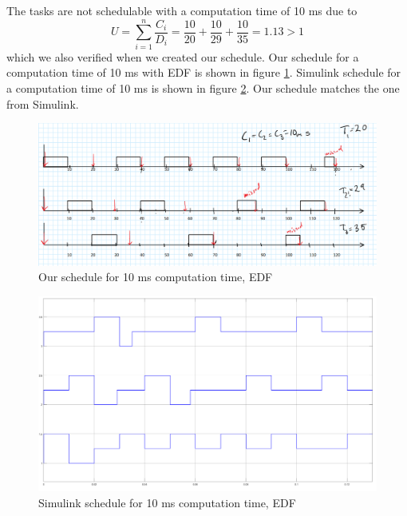 \documentclass[12pt,a4paper]{article}
\begin{document}
The tasks are not schedulable with a computation time of 10 ms due to 
\begin{equation}
U = \sum\limits_{i=1}^n \frac{C_i}{D_i} = \frac{10}{20}+\frac{10}{29}+\frac{10}{35} = 1.13 > 1
\end{equation}
which we also verified when we created our schedule. Our schedule for a
computation time of 10 ms with EDF is shown in figure \ref{fig:ex6541}. Simulink
schedule for a computation time of 10 ms is shown in figure
\ref{fig:ex6542}. Our
schedule matches the one from Simulink.

\begin{center}
	\begin{figure}[H]
      \centering
	\includegraphics[scale=0.4]{ex6541.png}
	\caption{Our schedule for 10 ms computation time, EDF}
	\label{fig:ex6541}
	\end{figure}
\end{center}
\begin{center}
	\begin{figure}[H]
      \centering
	\includegraphics[scale=0.2]{ex6542.png}
	\caption{Simulink schedule for 10 ms computation time, EDF}
	\label{fig:ex6542}
	\end{figure}
\end{center}
\end{document}
